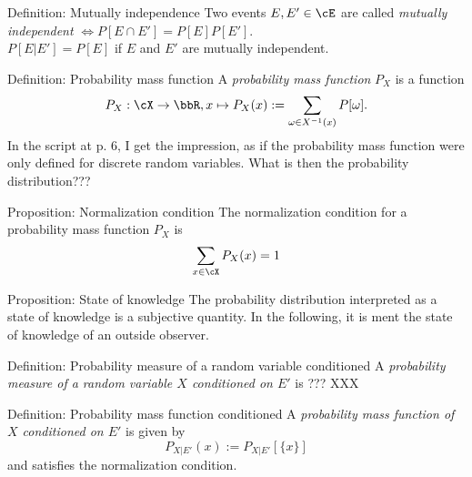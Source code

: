 \documentclass[
			print,
			a6paper,
			grid=none]{kartei}
\begin{document}
\begin{karte}{Definition: Mutually independence}
	Two events $E,E'\in\cE$ are called \emph{mutually independent} $\iff P[E\cap E']=P[E]P[E']$. \\ $P[E\vert E']=P[E]$ if $E$ and $E'$ are mutually independent.
\end{karte}

\begin{karte}{Definition: Probability mass function}
	A \emph{probability mass function} $P_X$ is a function
	\begin{equation*}
		P_X: \cX\to\bbR, x\mapsto P_X(x):=\sum_{\omega\in X^{-1}(x)}P[\omega].
	\end{equation*}
	In the script at p. 6, I get the impression, as if the probability mass function were only defined for discrete random variables. What is then the probability distribution???
\end{karte}

\begin{karte}{Proposition: Normalization condition}
	The normalization condition for a probability mass function $P_X$ is
	\begin{equation*}
		\sum_{x\in\cX} P_X(x)=1
	\end{equation*}
	\label{prop:normalization}
\end{karte}

\begin{karte}{Proposition: State of knowledge}
	The probability distribution interpreted as a state of knowledge is a subjective quantity. In the following, it is ment the state of knowledge of an outside observer.
\end{karte}

\begin{karte}{Definition: Probability measure of a random variable conditioned}
	A \emph{probability measure of a random variable $X$ conditioned on $E'$} is ??? XXX
\end{karte}

\begin{karte}{Definition: Probability mass function conditioned}
	A \emph{probability mass function of $X$ conditioned on $E'$} is given by
	\begin{equation*}
		P_{X\vert E'}(x):= P_{X\vert E'}[\{x\}]
	\end{equation*}
	and satisfies the normalization condition.
\end{karte}


\end{document}
